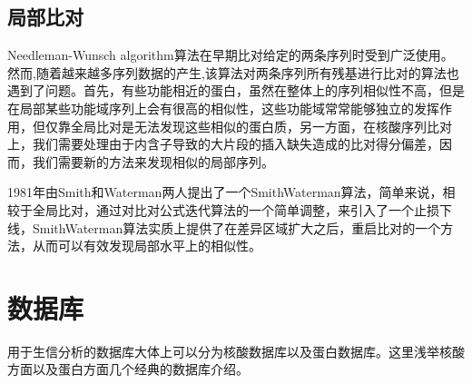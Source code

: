 \subsection {局部比对}
Needleman-Wunsch algorithm算法在早期比对给定的两条序列时受到广泛使用。然而,随着越来越多序列数据的产生,该算法对两条序列所有残基进行比对的算法也遇到了问题。首先，有些功能相近的蛋白，虽然在整体上的序列相似性不高，但是在局部某些功能域序列上会有很高的相似性，这些功能域常常能够独立的发挥作用，但仅靠全局比对是无法发现这些相似的蛋白质，另一方面，在核酸序列比对上，我们需要处理由于内含子导致的大片段的插入缺失造成的比对得分偏差，因而，我们需要新的方法来发现相似的局部序列。

1981年由Smith和Waterman两人提出了一个SmithWaterman算法，简单来说，相较于全局比对，通过对比对公式迭代算法的一个简单调整，来引入了一个止损下线，SmithWaterman算法实质上提供了在差异区域扩大之后，重启比对的一个方法，从而可以有效发现局部水平上的相似性。



\section {数据库}
用于生信分析的数据库大体上可以分为核酸数据库以及蛋白数据库。这里浅举核酸方面以及蛋白方面几个经典的数据库介绍。
